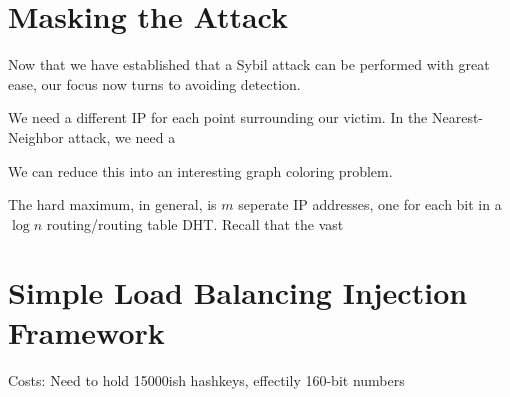 \documentclass[10pt,a4paper]{article}
\begin{document}
\section{Masking the Attack}
Now that we have established that a Sybil attack can be performed with great ease, our focus now turns to avoiding detection.

We need a different IP for each point surrounding our victim.  In the Nearest-Neighbor attack, we need a 

We can reduce this into an interesting graph coloring problem.


The hard maximum, in general, is $m$ seperate IP addresses, one for each bit in a $\log n$ routing/routing table DHT.
Recall that the vast


\section{Simple Load Balancing Injection Framework}

Costs:  Need to hold 15000ish hashkeys, effectily 160-bit numbers



\end{document}
